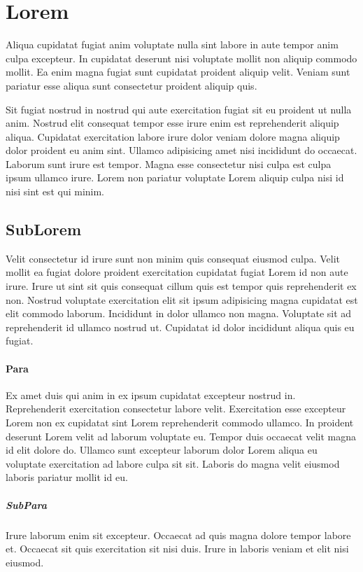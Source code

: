 \documentclass[a4paper]{article}
\begin{document}
    \section{Lorem}
    Aliqua cupidatat fugiat anim voluptate nulla sint labore in aute tempor anim culpa 
    excepteur. In cupidatat deserunt nisi voluptate mollit non aliquip commodo mollit. 
    Ea enim magna fugiat sunt cupidatat proident aliquip velit. Veniam sunt pariatur 
    esse aliqua sunt consectetur proident aliquip quis.

    Sit fugiat nostrud in nostrud qui aute exercitation fugiat sit eu proident ut nulla anim. 
    Nostrud elit consequat tempor esse irure enim est reprehenderit aliquip aliqua. Cupidatat 
    exercitation labore irure dolor veniam dolore magna aliquip dolor proident eu anim sint. 
    Ullamco adipisicing amet nisi incididunt do occaecat. Laborum sunt irure est tempor. 
    Magna esse consectetur nisi culpa est culpa ipsum ullamco irure. Lorem non pariatur 
    voluptate Lorem aliquip culpa nisi id nisi sint est qui minim.
    \subsection{SubLorem}
    Velit consectetur id irure sunt non minim quis consequat eiusmod culpa. 
    Velit mollit ea fugiat dolore proident exercitation cupidatat fugiat Lorem 
    id non aute irure. Irure ut sint sit quis consequat cillum quis est tempor
    quis reprehenderit ex non. Nostrud voluptate exercitation elit sit ipsum 
    adipisicing magna cupidatat est elit commodo laborum. Incididunt in dolor 
    ullamco non magna. Voluptate sit ad reprehenderit id ullamco nostrud ut. 
    Cupidatat id dolor incididunt aliqua quis eu fugiat.
    
    
    \paragraph{Para}
    Ex amet duis qui anim in ex ipsum cupidatat excepteur nostrud in. Reprehenderit exercitation consectetur labore velit. Exercitation esse excepteur Lorem non ex cupidatat sint Lorem reprehenderit commodo ullamco. In proident deserunt Lorem velit ad laborum voluptate eu. Tempor duis occaecat velit magna id elit dolore do. Ullamco sunt excepteur laborum dolor Lorem aliqua eu voluptate exercitation ad labore culpa sit sit. Laboris do magna velit eiusmod laboris pariatur mollit id eu.
    \subparagraph{SubPara}
    Irure laborum enim sit excepteur. Occaecat ad quis magna dolore tempor labore et. Occaecat sit quis exercitation sit nisi duis. Irure in laboris veniam et elit nisi eiusmod.
\end{document}
